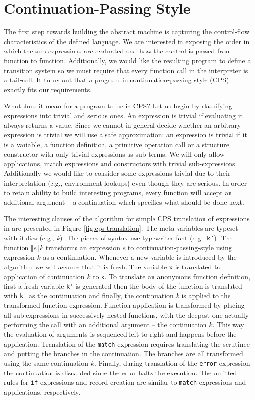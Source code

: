 \section{Continuation-Passing Style}
The first step towards building the abstract machine is capturing the control-flow characteristics of the defined language.
We are interested in exposing the order in which the sub-expressions are evaluated and how the control is passed from function to function.
Additionally, we would like the resulting program to define a transition system so we must require that every function call in the interpreter is a tail-call.
It turns out that a program in continuation-passing style (CPS) exactly fits our requirements.

What does it mean for a program to be in CPS?
Let us begin by classifying expressions into trivial and serious ones.
An expression is trivial if evaluating it always returns a value.
Since we cannot in general decide whether an arbitrary expression is trivial we will use a safe approximation: an expression is trivial if it is a variable, a function definition, a primitive operation call or a structure constructor with only trivial expressions as sub-terms.
We will only allow applications, match expressions and constructors with trivial sub-expressions.
Additionally we would like to consider some expressions trivial due to their interpretation (e.g., environment lookups) even though they are serious.
In order to retain ability to build interesting programs, every function will accept an additional argument -- a continuation which specifies what should be done next.

The interesting clauses of the algorithm for simple CPS translation of expressions in \IDL{} are presented in Figure \ref{fig:cps-translation}.
The meta variables are typeset with italics (e.g., \textit{k}).
The pieces of syntax use typewriter font (e.g., \texttt{k'}).
The function $ \llbracket e \rrbracket k $ transforms an expression $e$ to continuation-passing-style using expression $k$ as a continuation.
Whenever a new variable is introduced by the algorithm we will assume that it is fresh.
The variable \texttt{x} is translated to application of continuation $k$ to \texttt{x}.
To translate an anonymous function definition, first a fresh variable \texttt{k'} is generated then the body of the function is translated with \texttt{k'} as the continuation and finally, the continuation $k$ is applied to the transformed function expression.
Function application is transformed by placing all sub-expressions in successively nested functions, with the deepest one actually performing the call with an additional argument -- the continuation $k$.
This way the evaluation of arguments is sequenced left-to-right and happens before the application.
Translation of the \lstinline{match} expression requires translating the scrutinee and putting the branches in the continuation. The branches are all transformed using the same continuation $k$.
Finally, during translation of the \texttt{error} expression the continuation is discarded since the error halts the execution.
The omitted rules for \texttt{if} expressions and record creation are similar to \texttt{match} expressions and applications, respectively.

